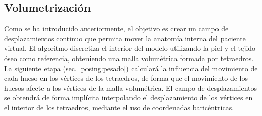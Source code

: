 \subsection{Volumetrización}
\label{posing:volumetrizacion}
%
Como se ha introducido anteriormente, el objetivo es crear un campo de desplazamientos continuo que permita mover la anatomía interna del paciente virtual. El algoritmo discretiza el interior del modelo utilizando la piel y el tejido óseo como referencia, obteniendo una malla volumétrica formada por tetraedros. %
La siguiente etapa (sec. \ref{posing:pesado}) calculará la influencia del movimiento de cada hueso en los vértices de los tetraedros, de forma que el movimiento de los huesos afecte a los vértices de la malla volumétrica. El campo de desplazamientos se obtendrá de forma implícita interpolando el desplazamiento de los vértices en el interior de los tetraedros, mediante el uso de coordenadas baricéntricas. %


